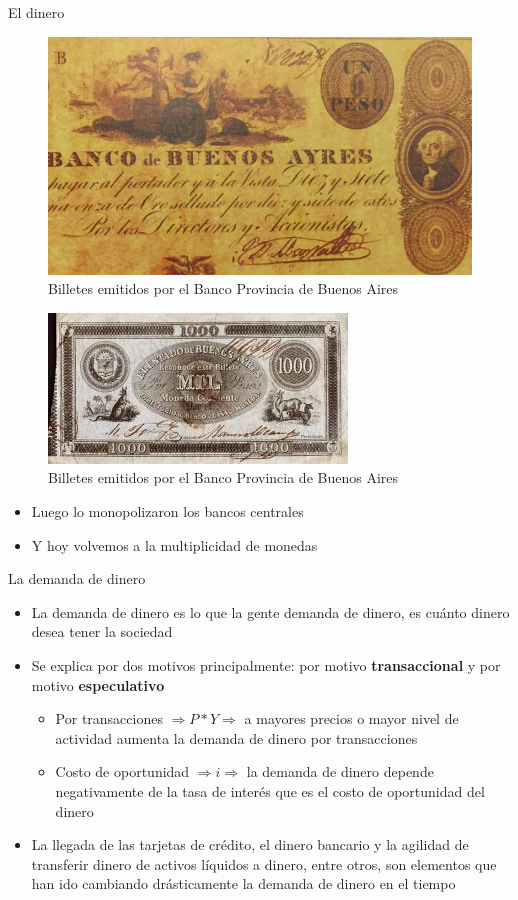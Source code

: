 \documentclass{beamer}
\begin{document}
\begin{frame}{El dinero}
        \begin{figure} [H]   
  \centering
  \includegraphics[width=.35\textwidth]{../Figures/C32.4.jpg}
      \caption{Billetes emitidos por el Banco Provincia de Buenos Aires}
  \label{fig:C32.4}
\end{figure}

\begin{figure} [H]   
\centering\includegraphics[width=.35\textwidth]{../Figures/C32.5.jpg}
\caption{Billetes emitidos por el Banco Provincia de Buenos Aires}
\end{figure}
       \begin{itemize}
           \item  Luego lo monopolizaron los bancos centrales
    \item Y hoy volvemos a la multiplicidad de monedas 
       \end{itemize}     
        \end{frame}


\begin{frame}{La demanda de dinero}
    \begin{itemize}
        \item La demanda de dinero es lo que la gente demanda de dinero, es cuánto dinero desea tener la sociedad
        \item Se explica por dos motivos principalmente: por motivo \textbf{transaccional} y por motivo \textbf{especulativo}
        \begin{itemize}
        \item Por transacciones $\Rightarrow P*Y \Rightarrow$ a mayores precios o mayor nivel de actividad aumenta la demanda de dinero por transacciones
        \item Costo de oportunidad $\Rightarrow i \Rightarrow $ la demanda de dinero depende negativamente de la tasa de interés que es el costo de oportunidad del dinero
    \end{itemize}
    \item La llegada de las tarjetas de crédito, el dinero bancario y la agilidad de transferir dinero de activos líquidos a dinero, entre otros, son elementos que han ido cambiando drásticamente la demanda de dinero en el tiempo
    \end{itemize}
\end{frame}
\end{document}
